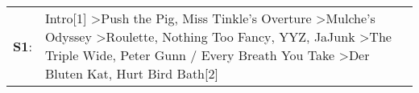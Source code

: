 \begin{supertabular}{p{0.03\textwidth}p{0.92\textwidth}}
 \textbf{S1}:  &  Intro[1]\textsuperscript{} \textgreater \enspace Push the Pig\textsuperscript{}, \enspace Miss Tinkle's Overture\textsuperscript{} \textgreater \enspace Mulche's Odyssey\textsuperscript{} \textgreater \enspace Roulette\textsuperscript{}, \enspace Nothing Too Fancy\textsuperscript{}, \enspace YYZ\textsuperscript{}, \enspace JaJunk\textsuperscript{} \textgreater \enspace The Triple Wide\textsuperscript{}, \enspace Peter Gunn / Every Breath You Take\textsuperscript{} \textgreater \enspace Der Bluten Kat\textsuperscript{}, \enspace Hurt Bird Bath[2]\textsuperscript{}  \enspace  \\
\end{supertabular}
